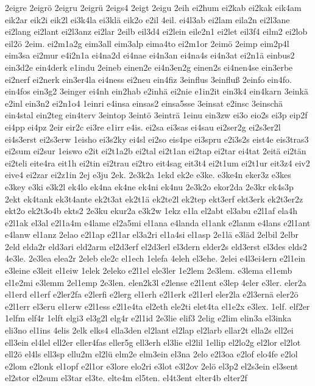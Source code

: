 {2eigre
2eigrö
2eigru
2eigrü
2eigs4
2eigt
2eigu
2eih
ei2hum
ei2kab
ei2kak
eik4am
eik2ar
eik2i
eik2l
ei3k4la
ei3klä
eik2o
e2il
4eil.
ei4l3ab
ei2lam
eila2n
ei2l3ane
ei2lang
ei2lant
ei2l3anz
ei2lar
2eilb
eil3d4
ei2lein
eile2n1
ei2let
eil3f4
eilm2
ei2lob
eil2ö
2eim.
ei2m1a2g
eim3all
eim3alp
eima4to
ei2m1or
2eimö
2eimp
eim2p4l
eim3sa
ei2mur
e4i2n1a
ei4na2d
ei4nae
ei4n3an
ei4na4s
ei4n3at
ei2n1ä
einbus2
ein3d2e
ein4derk
e1indu
2eineb
einen2e
ei4n3en2g
einen2s
ei4nen4se
ein3erbe
ei2nerf
ei2nerk
ein3er4la
ei4ness
ei2neu
ein4fiz
3einflus
3einfluß
2einfo
ein4fo.
ein4fos
ein3g2
3einger
ei4nh
ein2hab
e2inhä
ei2nie
e1in2it
ein3k4
ein4karn
3einkä
e2inl
ein3n2
ei2n1o4
1einri
e4insa
einsas2
einsa5sse
3einsat
e2insc
3einschä
ein4stal
ein2teg
ein4terv
3eintop
3eintö
3einträ
1einu
ein3zw
ei3o
eio2s
ei3p
eip2f
ei4pp
ei4pz
2eir
eir2c
ei3re
e1irr
e4is.
ei2sa
ei3sas
ei4sau
ei2ser2g
ei2s3er2l
ei4s3erst
ei2s3erw
1eisho
ei3s2ky
ei4sl
ei2so
eis4pe
ei3spru
e2i3s2s
eist4e
eis3tras3
ei2sum
ei2sur
1eiswo
e2it
ei2t1a2b
ei2tal
ei2t1an
ei2tap
ei2tar
ei4tat
2eitä
ei2tän
ei2teli
eite4ra
eit1h
ei2tin
ei2trau
ei2tro
eit4sag
eit3t4
ei2t1um
ei2t1ur
eit3z4
eiv2
eive4
ei2zar
ei2z1in
2ej
e3ju
2ek.
2e3k2a
1ekd
ek2e
e3ke.
e3ke4n
eker3z
e3kes
e3key
e3ki
e3k2l
ek4lo
ek4na
ek4ne
ek4ni
ek4nu
2e3k2o
ekor2da
2e3kr
ek4s3p
2ekt
ek4tank
ek3t4ante
ek2t3at
ek2t1ä
ek2te2l
ek2tep
ekt3erf
ekt3erk
ek2t3er2z
ekt2o
ek2t3o4b
ekts2
2e3ku
ekur2a
e3k2w
1ekz
e1la
el2abt
el3abu
e2l1af
ela4h
e2l1ak
el3al
e2l1a4m
e4lame
el2a5mi
el1ana
e4landa
el1ank
e2lanm
e4lans
e2l1ant
e4lanw
el1anz
2elao
e2l1ap
e2l1ar
el3a2ri
el1a4si
el1asp
2e1lä
e3läd
2elbil
2elbr
2eld
elda2r
eld3ari
eld2arm
el2d3erf
el2d3erl
el3dern
elder2s
eld3erst
el3des
elds2
4e3le.
2e3lea
elea2r
2eleb
ele2c
el1ech
1elefa
4eleh
el3ehe.
2elei
e4l3ei4ern
e2l1ein
e3leine
e3leit
el1eiw
1elek
2eleko
e2l1el
ele3ler
1e2lem
2e3lem.
e3lema
el1emb
el1e2mi
e3lemm
2el1emp
2e3len.
elen2k3l
e2lense
e2l1ent
e3lep
4eler
e3ler.
eler2a
el1erd
el1erf
e2ler2fa
e2lerfi
e2lerg
el1erh
e2l1erk
e2l1erl
eler2la
e2l3ernä
eler2ö
e2l1err
el3eru
el1erw
e2l1ess
e2l1e4ta
el2eth
ele2ti
elet4ta
el1e2x
e3lex.
1elf.
elf2er
1elfm
elf4r
1elft
elgi3
el3g2l
elg4r
e2l1id
2e3lie
elif3
2elig
e2lim
elin3a
el3inka
eli3no
el1ins
4elis
2elk
elks4
ella3den
el2lant
el2lap
el2larb
ellar2t
ella2s
ell2ei
ell3ein
el4lel
ell2er
eller4fas
eller5g
ell3erh
el3lie
el2lil
1ellip
el2lo2g
el2lor
el2lot
ell2ö
el4ls
ell3sp
ellu2m
el2lü
elm2e
elm3ein
el3na
2elo
e2l3oa
e2lof
elo4fe
e2lol
e2lom
e2lonk
el1opf
e2l1or
e3lore
elo2ri
e3lot
e3l2ov
2elö
el3p2
el2s3ein
el3sent
el2stor
el2sum
el3tar
el3te.
elte4m
el5ten.
el4t3ent
elter4b
elter2f
}
